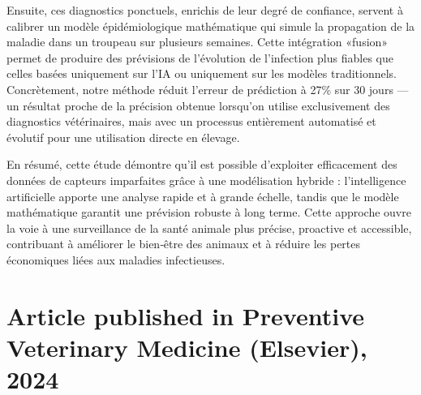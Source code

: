 Ensuite, ces diagnostics ponctuels, enrichis de leur degré de confiance, servent à calibrer un modèle épidémiologique mathématique qui simule la propagation de la maladie dans un troupeau sur plusieurs semaines. Cette intégration «fusion» permet de produire des prévisions de l’évolution de l’infection plus fiables que celles basées uniquement sur l’IA ou uniquement sur les modèles traditionnels. Concrètement, notre méthode réduit l’erreur de prédiction à 27\% sur 30 jours — un résultat proche de la précision obtenue lorsqu’on utilise exclusivement des diagnostics vétérinaires, mais avec un processus entièrement automatisé et évolutif pour une utilisation directe en élevage.

En résumé, cette étude démontre qu’il est possible d’exploiter efficacement des données de capteurs imparfaites grâce à une modélisation hybride : l’intelligence artificielle apporte une analyse rapide et à grande échelle, tandis que le modèle mathématique garantit une prévision robuste à long terme. Cette approche ouvre la voie à une surveillance de la santé animale plus précise, proactive et accessible, contribuant à améliorer le bien‑être des animaux et à réduire les pertes économiques liées aux maladies infectieuses.


\section{Article published in Preventive Veterinary Medicine (Elsevier), 2024}



